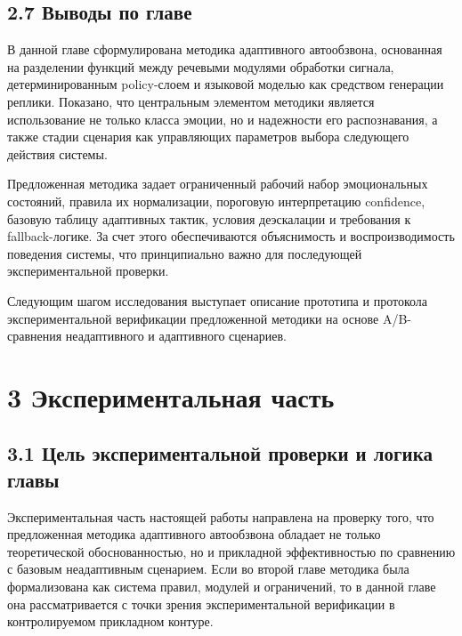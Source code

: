 \documentclass[a4paper,14pt]{extarticle}
\renewcommand{\texttt}[1]{\textnormal{#1}}
\begin{document}
\subsection{2.7 Выводы по
главе}\label{ux432ux44bux432ux43eux434ux44b-ux43fux43e-ux433ux43bux430ux432ux435-1}

В данной главе сформулирована методика адаптивного автообзвона,
основанная на разделении функций между речевыми модулями обработки
сигнала, детерминированным policy-слоем и языковой моделью как средством
генерации реплики. Показано, что центральным элементом методики является
использование не только класса эмоции, но и надежности его
распознавания, а также стадии сценария как управляющих параметров выбора
следующего действия системы.

Предложенная методика задает ограниченный рабочий набор эмоциональных
состояний, правила их нормализации, пороговую интерпретацию
\texttt{confidence}, базовую таблицу адаптивных тактик, условия
деэскалации и требования к fallback-логике. За счет этого обеспечиваются
объяснимость и воспроизводимость поведения системы, что принципиально
важно для последующей экспериментальной проверки.

Следующим шагом исследования выступает описание прототипа и протокола
экспериментальной верификации предложенной методики на основе
A/B-сравнения неадаптивного и адаптивного сценариев.

\section{3 Экспериментальная
часть}\label{ux44dux43aux441ux43fux435ux440ux438ux43cux435ux43dux442ux430ux43bux44cux43dux430ux44f-ux447ux430ux441ux442ux44c}

\subsection{3.1 Цель экспериментальной проверки и логика
главы}\label{ux446ux435ux43bux44c-ux44dux43aux441ux43fux435ux440ux438ux43cux435ux43dux442ux430ux43bux44cux43dux43eux439-ux43fux440ux43eux432ux435ux440ux43aux438-ux438-ux43bux43eux433ux438ux43aux430-ux433ux43bux430ux432ux44b}

Экспериментальная часть настоящей работы направлена на проверку того,
что предложенная методика адаптивного автообзвона обладает не только
теоретической обоснованностью, но и прикладной эффективностью по
сравнению с базовым неадаптивным сценарием. Если во второй главе
методика была формализована как система правил, модулей и ограничений,
то в данной главе она рассматривается с точки зрения экспериментальной
верификации в контролируемом прикладном контуре.
\end{document}
